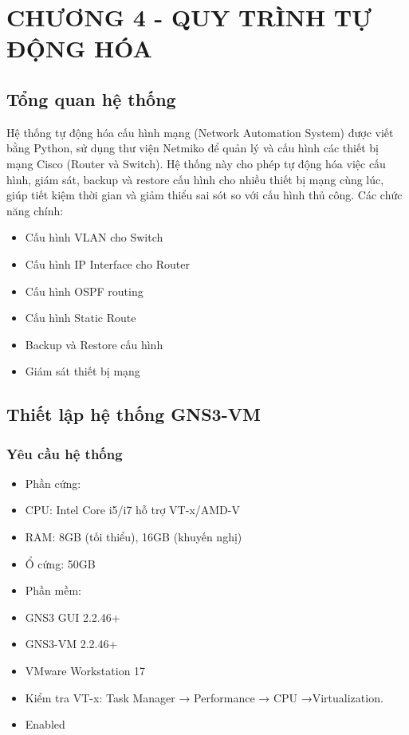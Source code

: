 \section*{CHƯƠNG 4 - QUY TRÌNH TỰ ĐỘNG HÓA}
\setcounter{section}{4}
\setcounter{subsection}{0}
\setcounter{figure}{0}
\setcounter{table}{0}


\subsection{Tổng quan hệ thống}
    Hệ thống tự động hóa cấu hình mạng (Network Automation System) được viết bằng Python, sử dụng thư viện Netmiko để quản lý và cấu hình các thiết bị mạng Cisco (Router và Switch). Hệ thống này cho phép tự động hóa việc cấu hình, giám sát, backup và restore cấu hình cho nhiều thiết bị mạng cùng lúc, giúp tiết kiệm thời gian và giảm thiểu sai sót so với cấu hình thủ công. 
    Các chức năng chính:
    
    \begin{itemize}
        \item Cấu hình VLAN cho Switch
        \item Cấu hình IP Interface cho Router
        \item Cấu hình OSPF routing
        \item Cấu hình Static Route
        \item Backup và Restore cấu hình
        \item Giám sát thiết bị mạng
    \end{itemize}
\subsection{Thiết lập hệ thống GNS3-VM}
\subsubsection{Yêu cầu hệ thống}
    \begin{itemize}
    \item[*] Phần cứng:
    \item CPU: Intel Core i5/i7 hỗ trợ VT-x/AMD-V
    \item RAM: 8GB (tối thiểu), 16GB (khuyến nghị)
    \item Ổ cứng: 50GB
    \item[*] Phần mềm:
    \item GNS3 GUI 2.2.46+
    \item GNS3-VM 2.2.46+
    \item VMware Workstation 17
    \item Kiểm tra VT-x: Task Manager → Performance → CPU →Virtualization.
    \item Enabled
    \end{itemize}
